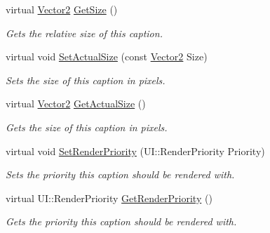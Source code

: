 \begin{DoxyCompactItemize}
virtual \hyperlink{classphys_1_1Vector2}{Vector2} \hyperlink{classphys_1_1UI_1_1Caption_a1da2e0e9ce0d904595f53a10244fcaf4}{GetSize} ()
\begin{DoxyCompactList}\small\item\em Gets the relative size of this caption. \item\end{DoxyCompactList}\item 
virtual void \hyperlink{classphys_1_1UI_1_1Caption_ad92716cc1c3ad3544aab5e892ae24225}{SetActualSize} (const \hyperlink{classphys_1_1Vector2}{Vector2} Size)
\begin{DoxyCompactList}\small\item\em Sets the size of this caption in pixels. \item\end{DoxyCompactList}\item 
virtual \hyperlink{classphys_1_1Vector2}{Vector2} \hyperlink{classphys_1_1UI_1_1Caption_aa80a4328d76458a6e869c485bea48b98}{GetActualSize} ()
\begin{DoxyCompactList}\small\item\em Gets the size of this caption in pixels. \item\end{DoxyCompactList}\item 
virtual void \hyperlink{classphys_1_1UI_1_1Caption_a27e71736c847ff6e50be7191e3db5225}{SetRenderPriority} (UI::RenderPriority Priority)
\begin{DoxyCompactList}\small\item\em Sets the priority this caption should be rendered with. \item\end{DoxyCompactList}\item 
virtual UI::RenderPriority \hyperlink{classphys_1_1UI_1_1Caption_ada0bf1e830f8f672adbc3263e7095896}{GetRenderPriority} ()
\begin{DoxyCompactList}\small\item\em Gets the priority this caption should be rendered with. \item\end{DoxyCompactList}\end{DoxyCompactItemize}
